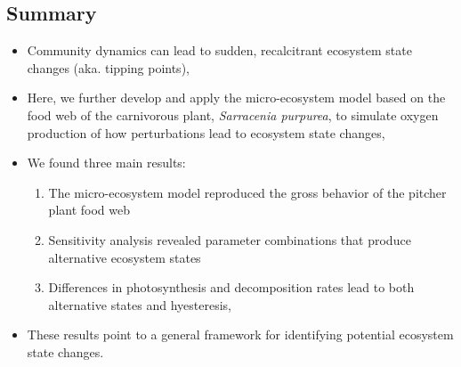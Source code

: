 \documentclass[a0,landscape]{a0poster}
\begin{document}
\begin{multicols}{4} %


\color{DarkBlue} %

\section*{Summary}
  
  \begin{itemize}
  \item Community dynamics can lead to sudden, recalcitrant ecosystem
    state changes (aka. tipping points),
  \item Here, we further develop and apply the micro-ecosystem model
    based on the food web of the carnivorous plant, \textit{Sarracenia
      purpurea}, to simulate oxygen production of how perturbations
    lead to ecosystem state changes,
  \item We found three main results:
    \begin{enumerate}
    \item The micro-ecosystem model reproduced the gross behavior of
      the pitcher plant food web
    \item Sensitivity analysis revealed parameter combinations that
      produce alternative ecosystem states
    \item Differences in photosynthesis and decomposition rates lead
      to both alternative states and hyesteresis,
    \end{enumerate}
  \item These results point to a general framework for identifying
    potential ecosystem state changes. 
  \end{itemize}





\end{multicols}
\end{document}
